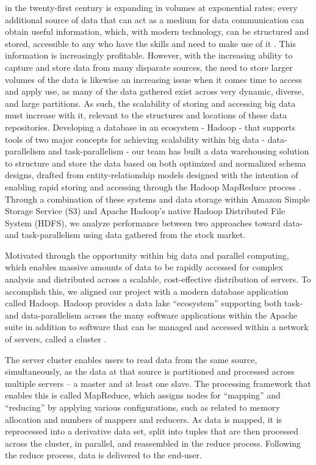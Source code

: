 \documentclass[journal]{IEEEtran}
\begin{document}
 in the twenty-first century is expanding in volumes
 at exponential rates; every additional source of data that can act as a
 medium for data communication can obtain useful information, which,
 with modern technology, can be structured and stored, accessible to any
 who have the skills and need to make use of it \cite{BigDataComputing}. 
This information is increasingly profitable. 
However, with the increasing ability to capture and store data from many
 disparate sources, the need to store larger volumes of the data is
 likewise an increasing issue when it comes time to access and apply use,
 as many of the data gathered exist across very dynamic, diverse, and
 large partitions. 
As such, the scalability of storing and accessing big data must increase
 with it, relevant to the structures and locations of these data repositories. 
Developing a database in an ecosystem - Hadoop - that supports tools of
 two major concepts for achieving scalability within big data -
 data-parallelism and task-parallelism - our team has built a data
 warehousing solution to structure and store the data based on both
 optimized and normalized schema designs, drafted from entity-relationship
 models designed with the intention of enabling rapid storing and accessing
 through the Hadoop MapReduce process \cite{BigDataComputing}. 
Through a combination of these systems and data storage within
 Amazon Simple Storage Service (S3) and Apache Hadoop's native Hadoop
 Distributed File System (HDFS), we analyze performance between two
 approaches toward data- and task-parallelism using data gathered from
 the stock market.

Motivated through the opportunity within big data and parallel computing,
which enables massive amounts of data to be rapidly accessed for complex
analysis and distributed across a scalable, cost-effective distribution of
servers. To accomplish this, we aligned our project with a modern database
application called Hadoop. Hadoop provides a data lake ``ecosystem'' 
supporting both task- and data-parallelism across the many software
applications within the Apache suite in addition to software that can 
be managed and accessed within a network of servers, called a cluster \cite{Intel, BigDataComputing}.

The server cluster enables users to read data from the same source,
simultaneously, as the data at that source is partitioned and
processed across multiple servers – a master and at least one slave. 
The processing framework that enables this is called MapReduce, 
which assigns nodes for ``mapping'' and ``reducing'' by applying 
various configurations, such as related to memory allocation and numbers
of mappers and reducers. As data is mapped, it is reprocessed into a derivative 
data set, split into tuples that are then processed across the cluster, in parallel, and reassembled in the reduce process. Following the reduce process, data is delivered to 
the end-user.
\end{document}
